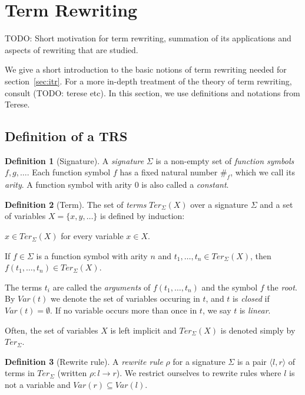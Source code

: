 \documentclass[11pt,oneside,a4paper,final]{report}
\theoremstyle{definition}
\newtheorem{definition}{Definition}
\begin{document}
\section{Term Rewriting}

TODO: Short motivation for term rewriting, summation of its applications and
aspects of rewriting that are studied.

We give a short introduction to the basic notions of term rewriting needed for
section~\ref{sec:itr}. For a more in-depth treatment of the theory of term
rewriting, consult (TODO: terese etc). In this section, we use definitions and
notations from Terese.


\subsection{Definition of a TRS}

\begin{definition}[Signature]
A \emph{signature} $\Sigma$ is a non-empty set of \emph{function symbols} $f,
g, \ldots$. Each function symbol $f$ has a fixed natural number $\#_f$, which
we call its \emph{arity}. A function symbol with arity $0$ is also called a
\emph{constant}.
\end{definition}

\begin{definition}[Term]
The set of \emph{terms} $Ter_\Sigma(X)$ over a signature $\Sigma$ and a set of
variables $X = \{x, y, \ldots\}$ is defined by induction:
\begin{compactenum}
  \item
    $x \in Ter_\Sigma(X)$ for every variable $x \in X$.
  \item
    If $f \in \Sigma$ is a function symbol with arity $n$ and $t_1, \ldots,
    t_n \in Ter_\Sigma(X)$, then $f(t_1, \ldots, t_n) \in Ter_\Sigma(X)$.
\end{compactenum}
\end{definition}

The terms $t_i$ are called the \emph{arguments} of $f(t_1, \ldots, t_n)$ and
the symbol $f$ the \emph{root}. By $Var(t)$ we denote the set of variables
occuring in $t$, and $t$ is \emph{closed} if $Var(t) = \emptyset$. If no
variable occurs more than once in $t$, we say $t$ is \emph{linear}.

Often, the set of variables $X$ is left implicit and $Ter_\Sigma(X)$ is
denoted simply by $Ter_\Sigma$.

\begin{definition}[Rewrite rule]
  A \emph{rewrite rule} $\rho$ for a signature $\Sigma$ is a pair $\langle l,
  r \rangle$ of terms in $Ter_\Sigma$ (written $\rho : l \rightarrow r$). We
  restrict ourselves to rewrite rules where $l$ is not a variable and $Var(r)
  \subseteq Var(l)$.
\end{definition}
\end{document}

